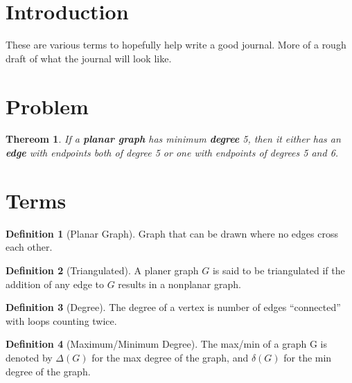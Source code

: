 \documentclass{article}
\newtheorem{thm}{Thereom}
\theoremstyle{definition}
\newtheorem{defn}{Definition}[section]
\begin{document}
\section{Introduction}
These are various terms to hopefully help write a good journal. More of a rough draft of what the journal will look like.

\section{Problem}
\begin{thm}
If a \textbf{planar graph} has minimum \textbf{degree} 5, then it either has an \textbf{edge} with endpoints both of degree 5 or one with endpoints of degrees 5 and 6.
\end{thm}

\section{Terms}

\begin{defn}[Planar Graph]
Graph that can be drawn where no edges cross each other.
\end{defn}

\begin{defn}[Triangulated]
A planer graph $G$ is said to be triangulated if the addition of any edge to $G$ results in a nonplanar graph.
\end{defn}

\begin{defn}[Degree]
The degree of a vertex is number of edges ``connected'' with loops counting twice.
\end{defn}

\begin{defn}[Maximum/Minimum Degree]
  The max/min of a graph G is denoted by $\Delta(G)$ for the max degree of the graph, and $\delta(G)$ for the min degree of the graph.
\end{defn}
\end{document}
